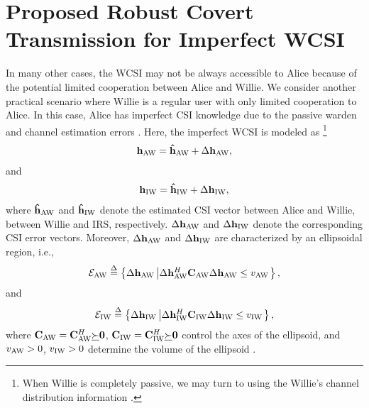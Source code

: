 \documentclass[10pt,journal,letterpaper,twocolumn,twoside]{IEEEtran} %
\begin{document}
%
 \section{Proposed Robust  Covert Transmission for Imperfect WCSI}
In many other cases,  the WCSI    may not be always accessible to Alice because of the potential limited
cooperation between Alice and Willie.
  We consider another practical scenario
where Willie is a regular user with only limited cooperation to Alice. In this case, Alice has imperfect CSI knowledge due to the passive warden \cite{Goeckel16cov} and channel
estimation errors \cite{Shahzad2017Covert,Forouzesh20Communication}.
Here, the imperfect
   WCSI is modeled as \footnote{
   When Willie is completely passive, we may turn to using the Willie's channel distribution information \cite{Zheng20Covert,Forouzesh19arXiv}.}
 \begin{align}
 {{\bf{h}}_{\rm{AW}}} = {{{\bf{\hat h}}}_{\rm{AW}}} + \Delta {{\bf{h}}_{\rm{AW}}},
 \end{align}
 and
  \begin{align}
 {{\bf{h}}_{\rm{IW}}} = {{{\bf{\hat h}}}_{\rm{IW}}} + \Delta {{\bf{h}}_{\rm{IW}}},
 \end{align}
 where ${{{\bf{\hat h}}}_{\rm{AW}}}$  and ${{{\bf{\hat h}}}_{\rm{IW}}}$ denote the   estimated CSI vector between Alice and Willie, between  Willie and IRS, respectively. $\Delta {{\bf{h}}_{\rm{AW}}}$ and $\Delta {{\bf{h}}_{\rm{IW}}}$  denote  the corresponding CSI error
vectors. Moreover,  $\Delta {{\bf{h}}_{\rm{AW}}}$ and $\Delta {{\bf{h}}_{\rm{IW}}}$ are
characterized by an ellipsoidal region, i.e.,
\begin{align}
{{\cal E}_{\rm{AW}}} \buildrel \Delta \over =\left\{ {\Delta {{\bf{h}}_{\rm{AW}}}\left| {\Delta {\bf{h}}_{\rm{AW}}^H{{\bf{C}}_{\rm{AW}}}\Delta {{\bf{h}}_{\rm{AW}}} \le {v_{\rm{AW}}}} \right.} \right\}\label{C_25},
\end{align}
and
\begin{align}
{{\cal E}_{\rm{IW}}} \buildrel \Delta \over =\left\{ {\Delta {{\bf{h}}_{\rm{IW}}}\left| {\Delta {\bf{h}}_{\rm{IW}}^H{{\bf{C}}_{\rm{IW}}}\Delta {{\bf{h}}_{\rm{IW}}} \le {v_{\rm{IW}}}} \right.} \right\}\label{C_26},
\end{align}
where ${{\bf{C}}_{\rm{AW}}} = {{\bf{C}}_{\rm{AW}}^H}\underline  \succ  {\bf{0}}$, ${{\bf{C}}_{\rm{IW}}} = {{\bf{C}}_{\rm{IW}}^H}\underline  \succ  {\bf{0}}$ control the axes of the ellipsoid, and  ${v_{\rm{AW}}}  >  0$, ${v_{\rm{IW}}}  >  0$ determine the volume of the ellipsoid \cite{XYu20Robust,Zhou20Robust}.
\end{document}
